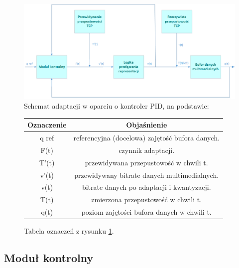 \begin{figure}[h!]
	\centering
		\includegraphics[width=\linewidth]{PID}
	\caption{Schemat adaptacji w oparciu o kontroler PID, na podstawie: \cite{Tian}}
	\label{fig:PID}
\end{figure}

\begin{figure}
	\centering
	\begin{tabular}{ c | c }
  		Oznaczenie & Objaśnienie \\
  		\hline
  		q ref	&  referencyjna (docelowa) zajętość bufora danych. \\
		F(t)	&  czynnik adaptacji. \\
		T'(t)	&  przewidywana przepustowość w chwili t. \\
		v'(t)	&  przewidywany bitrate danych multimedialnych. \\
		v(t)	&  bitrate danych po adaptacji i kwantyzacji.\\
		T(t)	&  zmierzona przepustowość w chwili t.\\
		q(t)	&  poziom zajętości bufora danych w chwili t. \\
	\end{tabular}
	\caption{Tabela oznaczeń z rysunku \ref{fig:PID}.}
	\label{PID_table}
\end{figure}

\subsection{Moduł kontrolny}

